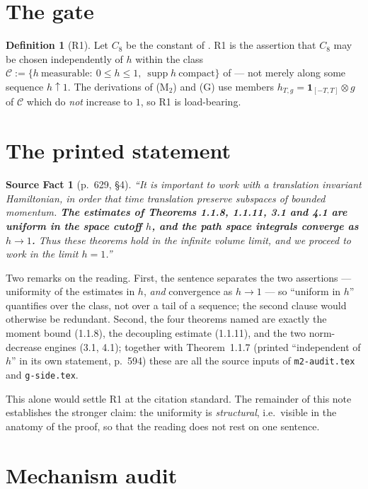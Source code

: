 \documentclass[11pt,a4paper]{article}
\theoremstyle{plain}
\theoremstyle{definition}
\newtheorem{definition}[theorem]{Definition}
\newtheorem{srcfact}[theorem]{Source Fact}
\DeclareMathOperator{\supp}{supp}
\begin{document}
\section{The gate}

\begin{definition}[R1]
Let $C_8$ be the constant of \cite[Thm.~1.1.8]{GJS}. R1 is the assertion that $C_8$ may be chosen
independently of $h$ within the class
$\mathcal C:=\{h\ \text{measurable}:\ 0\le h\le1,\ \supp h\ \text{compact}\}$
of \cite[p.~589]{GJS} --- not merely along some sequence $h\uparrow1$. The derivations of
(M$_2$) and (G) use members $h_{T,g}=\mathbf 1_{[-T,T]}\otimes g$ of $\mathcal C$ which do
\emph{not} increase to $1$, so R1 is load-bearing.
\end{definition}

\section{The printed statement}

\begin{srcfact}[p.~629, \S4]\label{sf:printed}
\emph{``It is important to work with a translation invariant Hamiltonian, in order that time
translation preserve subspaces of bounded momentum. \textbf{The estimates of Theorems 1.1.8,
1.1.11, 3.1 and 4.1 are uniform in the space cutoff $h$, and the path space integrals converge
as $h\to1$.} Thus these theorems hold in the infinite volume limit, and we proceed to work in
the limit $h=1$.''}
\end{srcfact}

Two remarks on the reading. First, the sentence separates the two assertions --- uniformity of
the estimates in $h$, \emph{and} convergence as $h\to1$ --- so ``uniform in $h$'' quantifies over
the class, not over a tail of a sequence; the second clause would otherwise be redundant.
Second, the four theorems named are exactly the moment bound (1.1.8), the decoupling estimate
(1.1.11), and the two norm-decrease engines (3.1, 4.1); together with Theorem~1.1.7 (printed
``independent of $h$'' in its own statement, p.~594) these are all the source inputs of
\texttt{m2-audit.tex} and \texttt{g-side.tex}.

This alone would settle R1 at the citation standard. The remainder of this note establishes the
stronger claim: the uniformity is \emph{structural}, i.e.\ visible in the anatomy of the proof,
so that the reading does not rest on one sentence.

\section{Mechanism audit}\label{sec:mech}
\end{document}
